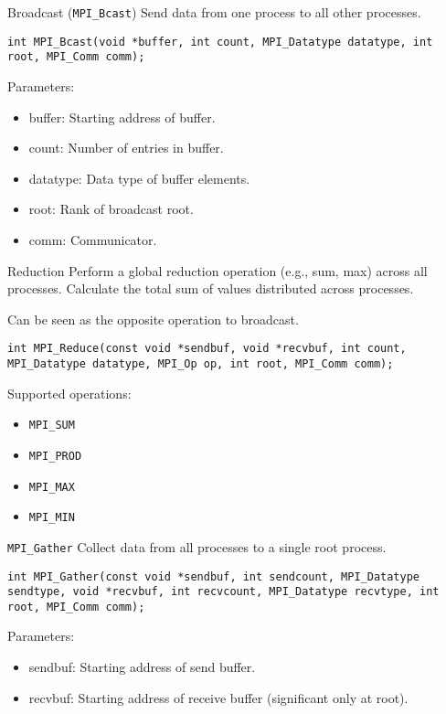 \documentclass{beamer}
\begin{document}
\begin{frame}{Broadcast (\texttt{MPI\_Bcast})}
  Send data from one process to all other processes.

  \texttt{int MPI\_Bcast(void *buffer, int count, MPI\_Datatype datatype, int root, MPI\_Comm comm);}

  Parameters:
  \begin{itemize}
    \item buffer: Starting address of buffer.
    \item count: Number of entries in buffer.
    \item datatype: Data type of buffer elements.
    \item root: Rank of broadcast root.
    \item comm: Communicator.
  \end{itemize}
\end{frame}

\begin{frame}{Reduction}
  Perform a global reduction operation (e.g., sum, max) across all processes. Calculate the total sum of values distributed across processes.

  Can be seen as the opposite operation to broadcast.

  \texttt{int MPI_Reduce(const void *sendbuf, void *recvbuf, int count, MPI_Datatype datatype, MPI_Op op, int root, MPI_Comm comm);}

  Supported operations:
  \begin{itemize}
    \item \texttt{MPI\_SUM}
    \item \texttt{MPI\_PROD}
    \item \texttt{MPI\_MAX}
    \item \texttt{MPI\_MIN}
  \end{itemize}
\end{frame}

\begin{frame}{\texttt{MPI\_Gather}}
  Collect data from all processes to a single root process.

  \texttt{int MPI\_Gather(const void *sendbuf, int sendcount, MPI\_Datatype sendtype, void *recvbuf, int recvcount, MPI\_Datatype recvtype, int root, MPI\_Comm comm);}

  Parameters:
  \begin{itemize}
    \item sendbuf: Starting address of send buffer.
    \item recvbuf: Starting address of receive buffer (significant only at root).
  \end{itemize}
\end{frame}
\end{document}
